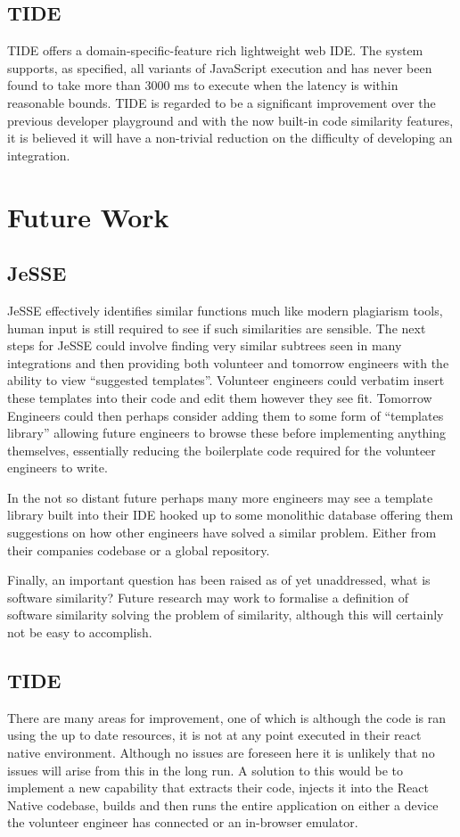 \documentclass[jou,apacite]{apa6}
\begin{document}
\subsection{TIDE}
TIDE offers a domain-specific-feature rich lightweight web IDE. The system supports, as specified, all variants of JavaScript execution and has never been found to take more than 3000 ms to execute when the latency is within reasonable bounds. TIDE is regarded to be a significant improvement over the previous developer playground and with the now built-in code similarity features, it is believed it will have a non-trivial reduction on the difficulty of developing an integration.
 
\section{Future Work}

\subsection{JeSSE}
 JeSSE effectively identifies similar functions much like modern plagiarism tools, human input is still required to see if such similarities are sensible. The next steps for JeSSE could involve finding very similar subtrees seen in many integrations and then providing both volunteer and tomorrow engineers with the ability to view “suggested templates”. Volunteer engineers could verbatim insert these templates into their code and edit them however they see fit.  Tomorrow Engineers could then perhaps consider adding them to some form of “templates library” allowing future engineers to browse these before implementing anything themselves, essentially reducing the boilerplate code required for the volunteer engineers to write. 

In the not so distant future perhaps many more engineers may see a template library built into their IDE hooked up to some monolithic database offering them suggestions on how other engineers have solved a similar problem. Either from their companies codebase or a global repository.

Finally, an important question has been raised as of yet unaddressed, what is software similarity? Future research may work to formalise a definition of software similarity solving the problem of similarity, although this will certainly not be easy to accomplish. 

\subsection{TIDE}
There are many areas for improvement, one of which is although the code is ran using the up to date resources, it is not at any point executed in their react native environment. Although no issues are foreseen here it is unlikely that no issues will arise from this in the long run. A solution to this would be to implement a new capability that extracts their code, injects it into the React Native codebase, builds and then runs the entire application on either a device the volunteer engineer has connected or an in-browser emulator. 
\end{document}
